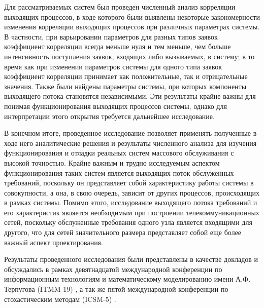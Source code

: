 Для рассматриваемых систем был проведен численный анализ корреляции выходящих процессов, в ходе которого были выявлены некоторые закономерности изменения корреляции выходящих процессов при различных параметрах системы. В частности, при варьировании параметров для разных типов заявок коэффициент корреляции всегда меньше нуля и тем меньше, чем больше интенсивность поступления заявок, входящих либо вызываемых, в систему; в то время как при изменении параметров системы для одного типа заявок коэффициент корреляции принимает как положительные, так и отрицательные значения. Также были найдены параметры системы, при которых компоненты выходящего потока становятся независимыми. Эти результаты крайне важны для понимая функционирования выходящих процессов системы, однако для интерпретации этого открытия требуется дальнейшее исследование.

В конечном итоге, проведенное исследование позволяет применять полученные в ходе него аналитические решения и результаты численного анализа  для изучения функционирования и отладки реальных систем массового обслуживания \cite{deering1991icmp,nutt1982performance} с высокой точностью. Крайне важным и трудно исследуемым аспектом функционирования таких систем является выходящих поток обслуженных требований, поскольку он представляет собой характеристику работы системы в совокупности, а она, в свою очередь, зависит от других процессов, происходящих в рамках системы. Помимо этого, исследование выходящего потока требований и его характеристик является необходимым при построении телекоммуникационных сетей, поскольку обслуженные требования одного узла является входящими для другого, что для сетей значительного размера представляет собой еще более важный аспект проектирования.

Результаты проведенного исследования были представлены в качестве докладов и обсуждались в рамках девятнадцатой международной конференции по информационным технологиям и математическому моделированию имени А.Ф. Терпугова (ITMM-19) \cite{blaginin2020two}, а так же пятой международной конференции по стохастическим методам (ICSM-5) \cite{lapatin2020asymptotic}.
 \clearpage